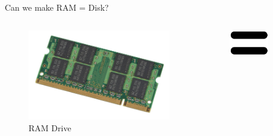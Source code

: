 \begin{frame}{Can we make RAM = Disk?}
\begin{columns}
    \begin{column}{0.30\textwidth}
    \begin{figure}
        \centering
        \includegraphics[width=\textwidth,height=0.55\textheight,keepaspectratio]{img/ramdrive.jpg}
        \caption{RAM Drive}
        \label{fig:my_label}
    \end{figure}
    \end{column}
    \begin{column}{0.30\textwidth}
    \begin{figure}
        \centering
        \includegraphics[width=\textwidth,height=0.55\textheight,keepaspectratio]{img/equals (2).png}
        \label{fig:my_label}
    \end{figure}
    \end{column}
    \begin{column}{0.30\textwidth}

\end{column}
\end{columns}
\end{frame}
